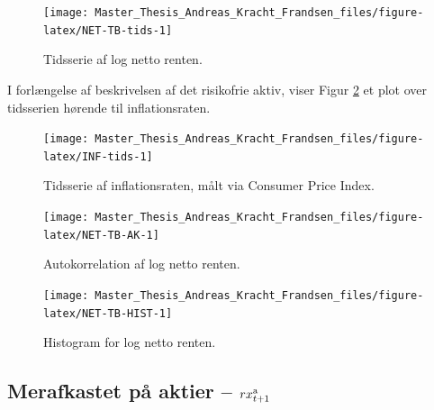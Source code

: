 \documentclass[
  a4paper,
  oneside]{memoir}
\begin{document}
\begin{figure}[H]

{\centering \texttt{[image: Master\_Thesis\_Andreas\_Kracht\_Frandsen\_files/figure-latex/NET-TB-tids-1]} 

}

\caption{Tidsserie af log netto renten.}\label{fig:NET-TB-tids}
\end{figure}

I forlængelse af beskrivelsen af det risikofrie aktiv, viser Figur \ref{fig:INF-tids} et plot over tidsserien hørende til inflationsraten.

\begin{figure}[H]

{\centering \texttt{[image: Master\_Thesis\_Andreas\_Kracht\_Frandsen\_files/figure-latex/INF-tids-1]} 

}

\caption{Tidsserie af inflationsraten, målt via Consumer Price Index.}\label{fig:INF-tids}
\end{figure}

\begin{figure}[H]

{\centering \texttt{[image: Master\_Thesis\_Andreas\_Kracht\_Frandsen\_files/figure-latex/NET-TB-AK-1]} 

}

\caption{Autokorrelation af log netto renten.}\label{fig:NET-TB-AK}
\end{figure}

\begin{figure}[H]

{\centering \texttt{[image: Master\_Thesis\_Andreas\_Kracht\_Frandsen\_files/figure-latex/NET-TB-HIST-1]} 

}

\caption{Histogram for log netto renten.}\label{fig:NET-TB-HIST}
\end{figure}

\hypertarget{dataak}{%
\subsection{\texorpdfstring{Merafkastet på aktier -- \(rx_{t+1}^{\textnormal{a}}\)}{Merafkastet på aktier -- rx\_\{t+1\}\^{}\{\textbackslash textnormal\{a\}\}}}\label{dataak}}
\end{document}
